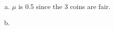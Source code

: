 \documentclass[11pt]{article}
\begin{document}
\begin{enumerate}  [(a)]
\item $\mu$ is 0.5 since the 3 coins are fair.

\item \  
\begin{figure}[htb]        
\end{figure}
\newpage
\begin{figure}[htb]        
\end{figure}


\end{enumerate}
\end{document}
